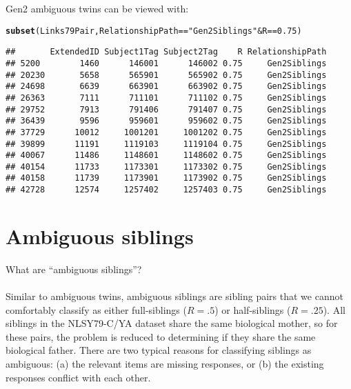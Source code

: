 \documentclass{article}\usepackage[]{graphicx}\usepackage[]{color}
\makeatletter
\newcommand{\hlnum}[1]{\textcolor[rgb]{0.686,0.059,0.569}{#1}}%
\newcommand{\hlstr}[1]{\textcolor[rgb]{0.192,0.494,0.8}{#1}}%
\newcommand{\hlopt}[1]{\textcolor[rgb]{0,0,0}{#1}}%
\newcommand{\hlstd}[1]{\textcolor[rgb]{0.345,0.345,0.345}{#1}}%
\newcommand{\hlkwd}[1]{\textcolor[rgb]{0.737,0.353,0.396}{\textbf{#1}}}%
\newenvironment{kframe}{%
 \def\at@end@of@kframe{}%
 \ifinner\ifhmode%
  \def\at@end@of@kframe{\end{minipage}}%
  \begin{minipage}{\columnwidth}%
 \fi\fi%
 \def\FrameCommand##1{\hskip\@totalleftmargin \hskip-\fboxsep
 \colorbox{shadecolor}{##1}\hskip-\fboxsep
     \hskip-\linewidth \hskip-\@totalleftmargin \hskip\columnwidth}%
 \MakeFramed {\advance\hsize-\width
   \@totalleftmargin\z@ \linewidth\hsize
   \@setminipage}}%
 {\par\unskip\endMakeFramed%
 \at@end@of@kframe}
\newenvironment{knitrout}{}{} %
\makeatother
\begin{document}
Gen2 ambiguous twins can be viewed with:
\begin{knitrout}
\color{fgcolor}\begin{kframe}
\begin{alltt}
\hlkwd{subset}\hlstd{(Links79Pair, RelationshipPath} \hlopt{==} \hlstr{"Gen2Siblings"} \hlopt{&} \hlstd{R} \hlopt{==} \hlnum{0.75}\hlstd{)}
\end{alltt}
\begin{verbatim}
##       ExtendedID Subject1Tag Subject2Tag    R RelationshipPath
## 5200        1460      146001      146002 0.75     Gen2Siblings
## 20230       5658      565901      565902 0.75     Gen2Siblings
## 24698       6639      663901      663902 0.75     Gen2Siblings
## 26363       7111      711101      711102 0.75     Gen2Siblings
## 29752       7913      791406      791407 0.75     Gen2Siblings
## 36439       9596      959601      959602 0.75     Gen2Siblings
## 37729      10012     1001201     1001202 0.75     Gen2Siblings
## 39899      11191     1119103     1119104 0.75     Gen2Siblings
## 40067      11486     1148601     1148602 0.75     Gen2Siblings
## 40154      11733     1173301     1173302 0.75     Gen2Siblings
## 40158      11739     1173901     1173902 0.75     Gen2Siblings
## 42728      12574     1257402     1257403 0.75     Gen2Siblings
\end{verbatim}
\end{kframe}
\end{knitrout}

% 

\section{Ambiguous siblings}
\textsf{What are ``ambiguous siblings''?}\\ \\
Similar to ambiguous twins, ambiguous siblings are sibling pairs that we cannot comfortably classify as either full-siblings ($R=.5$) or half-siblings ($R=.25$).  All siblings in the NLSY79-C/YA dataset share the same biological mother, so for these pairs, the problem is reduced to determining if they share the same biological father.  There are two typical reasons for classifying siblings as ambiguous: (a) the relevant items are missing responses, or (b) the existing responses conflict with each other.  
\end{document}
